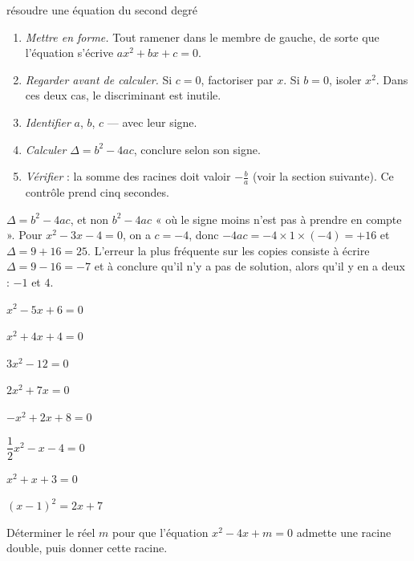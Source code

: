 \begin{methode}{résoudre une équation du second degré}
\begin{enumerate}[label=\textbf{\arabic*.}, leftmargin=*, itemsep=0.15em]
  \item \emph{Mettre en forme.} Tout ramener dans le membre de gauche, de
        sorte que l'équation s'écrive $ax^{2}+bx+c = 0$.
  \item \emph{Regarder avant de calculer.} Si $c = 0$, factoriser par $x$.
        Si $b = 0$, isoler $x^{2}$. Dans ces deux cas, le discriminant est
        inutile.
  \item \emph{Identifier} $a$, $b$, $c$ — avec leur signe.
  \item \emph{Calculer} $\Delta = b^{2}-4ac$, conclure selon son signe.
  \item \emph{Vérifier} : la somme des racines doit valoir $-\frac ba$
        (voir la section suivante). Ce contrôle prend cinq secondes.
\end{enumerate}
\end{methode}

\begin{erreurclassique}
$\Delta = b^{2}-4ac$, et non $b^{2}-4ac$ « où le signe moins n'est pas à
prendre en compte ». Pour $x^{2}-3x-4 = 0$, on a $c = -4$, donc
$-4ac = -4\times1\times(-4) = +16$ et $\Delta = 9+16 = 25$. L'erreur la plus
fréquente sur les copies consiste à écrire $\Delta = 9-16 = -7$ et à conclure
qu'il n'y a pas de solution, alors qu'il y en a deux : $-1$ et $4$.
\end{erreurclassique}

\begin{entrainement}
\exo[\niveau{1}] $x^{2}-5x+6 = 0$

\exo[\niveau{1}] $x^{2}+4x+4 = 0$

\exo[\niveau{1}] $3x^{2}-12 = 0$

\exo[\niveau{1}] $2x^{2}+7x = 0$

\exo[\niveau{2}] $-x^{2}+2x+8 = 0$

\exo[\niveau{2}] $\dfrac{1}{2}x^{2}-x-4 = 0$

\exo[\niveau{2}] $x^{2}+x+3 = 0$

\exo[\niveau{2}] $(x-1)^{2} = 2x+7$

\exo[\niveau{3}] Déterminer le réel $m$ pour que l'équation
$x^{2}-4x+m = 0$ admette une racine double, puis donner cette racine.
\end{entrainement}

